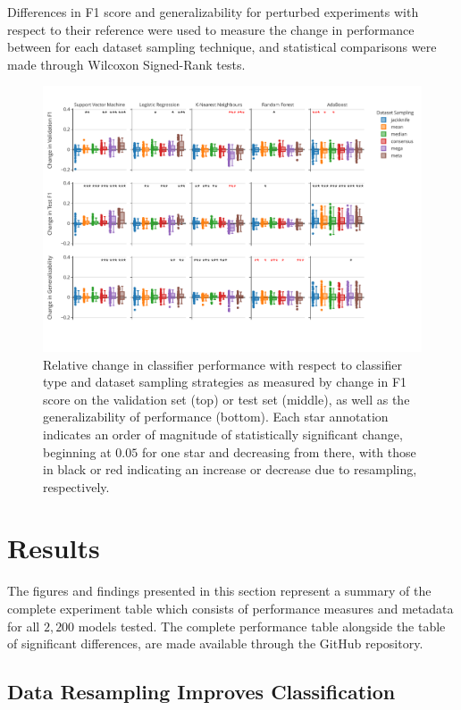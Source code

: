 \documentclass[10pt]{SelfArx} %
\begin{document}
Differences in F1 score and generalizability for perturbed experiments with respect to their reference were used to
measure the change in performance between for each dataset sampling technique, and statistical comparisons were made
through Wilcoxon Signed-Rank tests.

\begin{figure}[bth!]\centering
\includegraphics[width=\linewidth]{figures/1.pdf}
\caption{Relative change in classifier performance with respect to classifier type and dataset sampling strategies as
measured by change in F1 score on the validation set (top) or test set (middle), as well as the generalizability of
performance (bottom). Each star annotation indicates an order of magnitude of statistically significant change,
beginning at $0.05$ for one star and decreasing from there, with those in black or red indicating an increase or
decrease due to resampling, respectively.}
\label{fig:overall_perf}
\end{figure}

\section*{Results}

The figures and findings presented in this section represent a summary of the complete experiment table which consists
of performance measures and metadata for all $2,200$ models tested. The complete performance table alongside the table
of significant differences, are made available through the GitHub repository.

\subsection*{Data Resampling Improves Classification}
\end{document}
